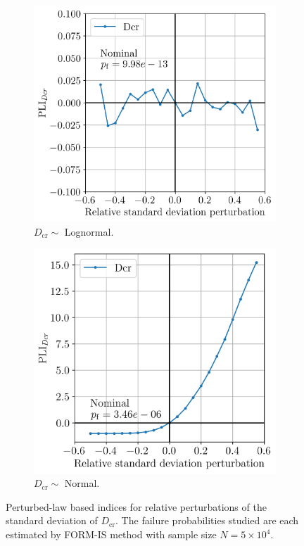 \begin{figure}
    \centering
    \begin{subfigure}[t]{0.48\linewidth}
        \includegraphics[width=\linewidth]{./part3/figures/OWT/PLI_Dcr_Hyp_LogNormal.png}
        \caption{$D_{\mathrm{cr}} \sim $ Lognormal.}
    \end{subfigure}
    \begin{subfigure}[t]{0.45\linewidth}
        \includegraphics[width=\linewidth]{./part3/figures/OWT/PLI_Dcr_Hyp_Normal.png}
        \caption{$D_{\mathrm{cr}} \sim $ Normal.}
    \end{subfigure}
    \caption{Perturbed-law based indices for relative perturbations of the standard deviation of $D_{\mathrm{cr}}$. 
    The failure probabilities studied are each estimated by FORM-IS method with sample size $N=5 \times 10^4$.}
    \label{fig:pli_resistance}
\end{figure}

